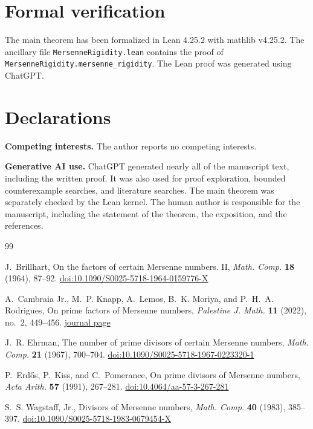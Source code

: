 \documentclass[11pt]{amsart}
\theoremstyle{remark}
\begin{document}
\section*{Formal verification}
The main theorem has been formalized in Lean 4.25.2 with mathlib
v4.25.2. The ancillary file \texttt{MersenneRigidity.lean} contains the
proof of \texttt{MersenneRigidity.mersenne\_rigidity}.
The Lean proof was generated using ChatGPT.

\section*{Declarations}

\noindent\textbf{Competing interests.}
The author reports no competing interests.

\smallskip
\noindent\textbf{Generative AI use.}
ChatGPT generated nearly all of the manuscript text, including the written
proof. It was also used for proof exploration, bounded counterexample
searches, and literature searches. The main theorem was separately checked
by the Lean kernel. The human author is responsible for the manuscript,
including the statement of the theorem, the exposition, and the references.

\begin{thebibliography}{99}

J.~Brillhart,
On the factors of certain Mersenne numbers. II,
\emph{Math. Comp.} \textbf{18} (1964), 87--92.
\href{https://doi.org/10.1090/S0025-5718-1964-0159776-X}{doi:10.1090/S0025-5718-1964-0159776-X}

A.~Cambraia Jr., M.~P. Knapp, A.~Lemos, B.~K. Moriya, and
P.~H.~A. Rodrigues,
On prime factors of Mersenne numbers,
\emph{Palestine J. Math.} \textbf{11} (2022), no.~2, 449--456.
\href{https://pjm.ppu.edu/paper/1088-prime-factors-mersenne-numbers}{journal page}

J.~R. Ehrman,
The number of prime divisors of certain Mersenne numbers,
\emph{Math. Comp.} \textbf{21} (1967), 700--704.
\href{https://doi.org/10.1090/S0025-5718-1967-0223320-1}{doi:10.1090/S0025-5718-1967-0223320-1}

P.~Erd{\H{o}}s, P.~Kiss, and C.~Pomerance,
On prime divisors of Mersenne numbers,
\emph{Acta Arith.} \textbf{57} (1991), 267--281.
\href{https://doi.org/10.4064/aa-57-3-267-281}{doi:10.4064/aa-57-3-267-281}

S.~S. Wagstaff, Jr.,
Divisors of Mersenne numbers,
\emph{Math. Comp.} \textbf{40} (1983), 385--397.
\href{https://doi.org/10.1090/S0025-5718-1983-0679454-X}{doi:10.1090/S0025-5718-1983-0679454-X}

\end{thebibliography}
\end{document}
